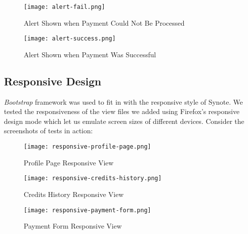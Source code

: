 \begin{figure}[!hbt]
  \centering
 	\texttt{[image: alert-fail.png]}
  \caption{Alert Shown when Payment Could Not Be Processed}
 	\label{fig:alert-success}
\end{figure}

\begin{figure}[!hbt]
  \centering
 	\texttt{[image: alert-success.png]}
  \caption{Alert Shown when Payment Was Successful}
 	\label{fig:alert-fail}
\end{figure}

\subsection{Responsive Design}
\label{subsec:responsive-design}

\textit{Bootstrap} framework was used to fit in with the responsive style of Synote. We tested the responsiveness of the view files we added using Firefox’s responsive design mode \cite{firefoxresponsive} which let us emulate screen sizes of different devices. Consider the screenshots of tests in action:\\

\begin{figure}[!htb]
    \centering
    \begin{minipage}{.45\textwidth}
        \centering
        \texttt{[image: responsive-profile-page.png]}
        \caption{Profile Page Responsive View}
        \label{fig:responsive-profile}
        \texttt{[image: responsive-credits-history.png]}
        \caption{Credits History Responsive View}
        \label{fig:responsive-credits-history}
    \end{minipage}%
    \hspace{0.1cm}
    \begin{minipage}{0.5\textwidth}
      \centering
      \centering
      \texttt{[image: responsive-payment-form.png]}
      \caption{Payment Form Responsive View}
      \label{fig:responsive-payment-form}
    \end{minipage}
\end{figure}
